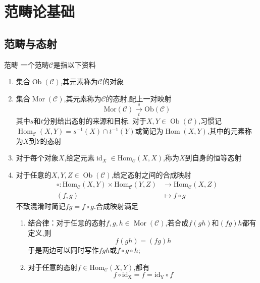\documentclass[../../几何与拓扑.tex]{subfiles}
\begin{document}
    
\chapter{范畴论基础}

\section{范畴与态射}

\begin{definition}{范畴}
    一个范畴$\mathcal{C}$是指以下资料
    \begin{enumerate}
        \item 集合$\operatorname{Ob}{\left( \mathcal{C} \right)}$,其元素称为$\mathcal{C}$的对象
        \item 集合$\operatorname{Mor}{\left( \mathcal{C} \right)}$,其元素称为$\mathcal{C}$的态射,配上一对映射$$\mathrm{Mor}(\mathcal{C})\xrightarrow[t]{s}\mathrm{Ob}(\mathcal{C})$$其中$s$和$t$分别给出态射的来源和目标.
        对于$X,Y\in \operatorname{Ob}{\left( \mathcal{C} \right)}$,习惯记$\operatorname{Hom}_\mathcal{C}{\left( X,Y \right)}=s ^{-1}\left( X \right)\cap t^{-1}\left( Y \right)$或简记为$\operatorname{Hom}{\left( X,Y \right)}$,其中的元素称为$X$到$Y$的态射
        \item 对于每个对象$X$,给定元素$\operatorname{id}_{X}{}\in \operatorname{Hom_{\mathcal{C}}}{\left( X,X \right)}$,称为$X$到自身的恒等态射
        \item 对于任意的$X,Y,Z \in \operatorname{Ob}{\left( \mathcal{C} \right)}$,给定态射之间的合成映射 
        $$ \begin{aligned} \circ : \operatorname{Hom_{\mathcal{C}}}{\left( X,Y \right)  }\times \operatorname{Hom_{\mathcal{C}}}{\left( Y,Z \right)  } & \to \operatorname{Hom_{\mathcal{C}}}{\left( X,Z \right) }  \\\left( f,g \right)  & \mapsto f\circ g
        \end{aligned} $$
        不致混淆时简记$fg=f\circ g$.合成映射满足
        \begin{enumerate}
            \item 结合律：对于任意的态射$f,g,h \in \operatorname{Mor}{\left( \mathcal{C} \right)}$,若合成$f\left( gh \right)$和$\left( fg \right)h$都有定义,则 $$ f\left( gh \right) =\left( fg \right) h $$于是两边可以同时写作$fgh$或$f\circ g\circ h$;
            \item 对于任意的态射$f \in \operatorname{Hom_{\mathcal{C}}}{\left( X,Y \right)}$,都有 $$ f\circ \operatorname{id_{X}}{}=f=\operatorname{id_{Y}}{}\circ f $$
        \end{enumerate}
    \end{enumerate}
    
\end{definition}
\end{document}
